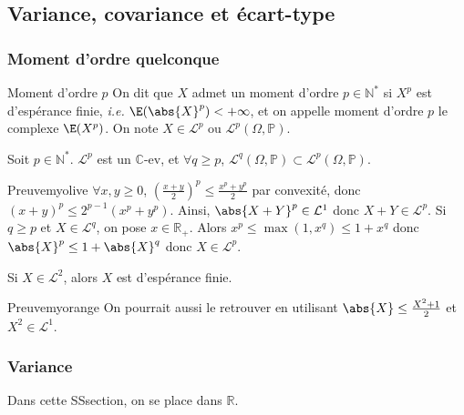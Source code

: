 \subsection{Variance, covariance et écart-type}

    \subsubsection{Moment d’ordre quelconque}

    \begin{defi}{Moment d’ordre $p$}{}
        On dit que $X$ admet un moment d’ordre $p \in \mathbb{N}^*$ si $X^p$ est d’espérance finie, \textit{i.e.} $\E(\abs{X}^p) < +\infty$, et on appelle moment d’ordre $p$ le complexe $\E(X^p)$. On note $X \in \mathcal{L}^p$ ou $\mathcal{L}^p(\Omega, \mathbb{P})$.
    \end{defi}

    \begin{prop}{}{}
        Soit $p \in \mathbb{N}^*$. $\mathcal{L}^p$ est un $\mathbb{C}$-ev, et $\forall q \geq p$, $\mathcal{L}^q(\Omega,\mathbb{P}) \subset \mathcal{L}^p(\Omega,\mathbb{P})$.
    \end{prop}

    \begin{demo}{Preuve}{myolive}
        $\forall x,y \geq 0$, $\left(\frac{x + y}{2}\right)^p \leq \frac{x^p + y^p}{2}$ par convexité, donc $(x + y)^p \leq 2^{p-1} (x^p + y^p)$. Ainsi, $\abs{X + Y}^p \in \mathcal{L}^1$ donc $X + Y \in \mathcal{L}^p$. Si $q \geq p$ et $X \in \mathcal{L}^q$, on pose $x \in \mathbb{R}_+$. Alors $x^p \leq \max(1, x^q) \leq 1 + x^q$ donc $\abs{X}^p \leq 1 + \abs{X}^q$ donc $X \in \mathcal{L}^p$. 
    \end{demo}

    \begin{coro}{}{}
        Si $X \in \mathcal{L}^2$, alors $X$ est d’espérance finie.
    \end{coro}

    \begin{demo}{Preuve}{myorange}
        On pourrait aussi le retrouver en utilisant $\abs{X} \leq \frac{X^2 + 1}{2}$ et $X^2 \in \mathcal{L}^1$.
    \end{demo}

    \subsubsection{Variance}

    Dans cette SSsection, on se place dans $\mathbb{R}$. 

